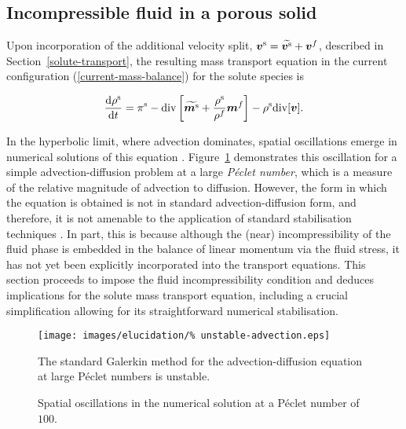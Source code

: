 \subsection{Incompressible fluid in a porous solid}
\label{incompressible-fluid-porous-solid}

Upon incorporation of the additional velocity split,
$\mbox{\boldmath$ v$}^\mathrm{s}=\widetilde{\mbox{\boldmath$ v$}^\mathrm{s}}+\mbox{\boldmath$ v$}^f$, described in
Section~\ref{solute-transport}, the resulting mass transport equation
in the current configuration (\ref{current-mass-balance}) for the
solute species is

\begin{equation}
\frac{\mathrm{d}\rho^\mathrm{s}}{\mathrm{d}t} = \pi^\mathrm{s}-
\mathrm{div} \left[\widetilde{\mbox{\boldmath$ m$}^\mathrm{s}}+
  \frac{\rho^\mathrm{s}}{\rho^f}\mbox{\boldmath$ m$}^f\right] - \rho^\mathrm{s}
\mathrm{div}[\mbox{\boldmath$ v$}].
\label{massbalcurrsol}
\end{equation}

\noindent In the hyperbolic limit, where advection dominates, spatial
oscillations emerge in numerical solutions of this equation
\citep{Brooks:82,Paper6}. Figure~\ref{unstable-solution} demonstrates
this oscillation for a simple advection-diffusion problem at a large
{\em P\'eclet number}, which is a measure of the relative magnitude of
advection to diffusion. However, the form in which the equation is
obtained is not in standard advection-diffusion form, and therefore,
it is not amenable to the application of standard stabilisation
techniques \citep{Paper6}. In part, this is because although the
(near) incompressibility of the fluid phase is embedded in the balance
of linear momentum via the fluid stress, it has not yet been
explicitly incorporated into the transport equations. This section
proceeds to impose the fluid incompressibility condition and deduces
implications for the solute mass transport equation, including a
crucial simplification allowing for its straightforward numerical
stabilisation.

\begin{figure}
  \begin{center}
  \texttt{[image: images/elucidation/\%
    unstable-advection.eps]}
  \caption{Spatial oscillations in the numerical solution at a
    P\'eclet number of $100$.}
  \label{unstable-solution}
  \end{center}
  {The standard Galerkin method for the advection-diffusion equation
    at large P\'eclet numbers is unstable.}
\end{figure}

